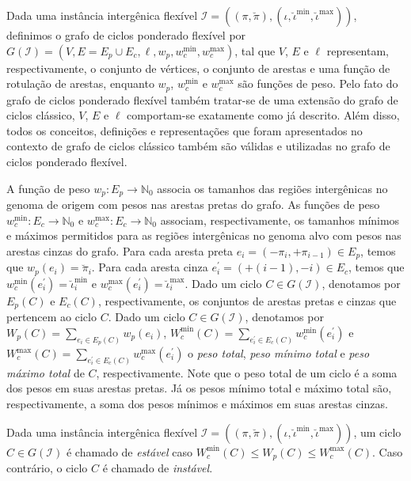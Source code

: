 Dada uma instância intergênica flexível $\mathcal{I} = ((\pi,\breve\pi),(\iota,\breve\iota^{\min},\breve\iota^{\max}))$, definimos o grafo de ciclos ponderado flexível por $G(\mathcal{I}) = (V, E=E_p \cup E_c, \ell, w_p, w^{\min}_c, w^{\max}_c)$, tal que $V$, $E$ e $\ell$ representam, respectivamente, o conjunto de vértices, o conjunto de arestas e uma função de rotulação de arestas, enquanto $w_p$, $w^{\min}_c$ e $w^{\max}_c$ são funções de peso. Pelo fato do grafo de ciclos ponderado flexível também tratar-se de uma extensão do grafo de ciclos clássico, $V$, $E$ e $\ell$ comportam-se exatamente como já descrito. Além disso, todos os conceitos, definições e representações que foram apresentados no contexto de grafo de ciclos clássico também são válidas e utilizadas no grafo de ciclos ponderado flexível.

A função de peso $w_p : E_p \rightarrow \mathbb{N}_0$ associa os tamanhos das regiões intergênicas no genoma de origem com pesos nas arestas pretas do grafo. As funções de peso $w^{\min}_c : E_c \rightarrow \mathbb{N}_0$ e $w^{\max}_c : E_c \rightarrow \mathbb{N}_0$ associam, respectivamente, os tamanhos mínimos e máximos permitidos para as regiões intergênicas no genoma alvo com pesos nas arestas cinzas do grafo. Para cada aresta preta $e_i = (-\pi_i, +\pi_{i-1}) \in E_p$, temos que $w_p(e_i) = \breve\pi_i$. Para cada aresta cinza $e^{\prime}_i = (+(i-1), -i) \in E_c$, temos que $w^{\min}_c(e^{\prime}_i) = \breve\iota^{\min}_i$ e $w^{\max}_c(e^{\prime}_i) = \breve\iota^{\max}_i$. Dado um ciclo $C \in G(\mathcal{I})$, denotamos por $E_p(C)$ e $E_c(C)$, respectivamente, os conjuntos de arestas pretas e cinzas que pertencem ao ciclo $C$. Dado um ciclo $C \in G(\mathcal{I})$, denotamos por $W_p(C)=\sum_{e_i \in E_p(C)} w_p(e_i)$, $W^{\min}_c(C)=\sum_{e^{\prime}_i \in E_c(C)} w^{\min}_c(e^{\prime}_i)$ e $W^{\max}_c(C)=\sum_{e^{\prime}_i \in E_c(C)} w^{\max}_c(e^{\prime}_i)$ o \emph{peso total}, \emph{peso mínimo total} e \emph{peso máximo total} de $C$, respectivamente. Note que o peso total de um ciclo é a soma dos pesos em suas arestas pretas. Já os pesos mínimo total e máximo total são, respectivamente, a soma dos pesos mínimos e máximos em suas arestas cinzas. 

\begin{definition}
Dada uma instância intergênica flexível $\mathcal{I} = ((\pi,\breve\pi),(\iota,\breve\iota^{\min},\breve\iota^{\max}))$, um ciclo $C \in G(\mathcal{I})$ é chamado de \emph{estável} caso $W^{\min}_c(C) \le W_p(C) \le W^{\max}_c(C)$. Caso contrário, o ciclo $C$ é chamado de \emph{instável}.
\end{definition}

